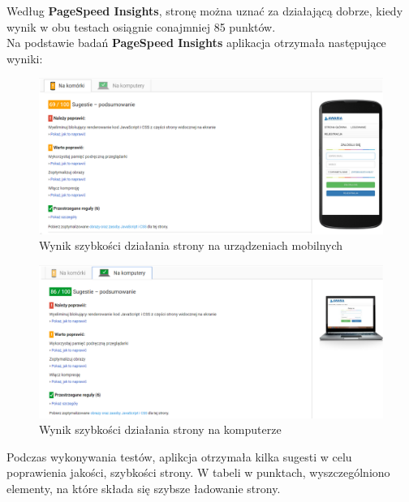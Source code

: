 \documentclass[openright]{xmgr}
\begin{document}
	Według \textbf{PageSpeed Insights}, stronę można uznać za działającą dobrze, kiedy wynik w obu testach osiągnie conajmniej 85 punktów.\\
	
	\newpage
	Na podstawie badań \textbf{PageSpeed Insights} aplikacja otrzymała następujące wyniki: 	
	
	\begin{figure}[!tbh]
		\centering
		\includegraphics[width=\linewidth]{image/phoneo}
		\caption{Wynik szybkości działania strony na urządzeniach mobilnych}
	\end{figure}
	
	\begin{figure}[!tbh]
		\centering
		\includegraphics[width=\linewidth]{image/computero}
		\caption{Wynik szybkości działania strony na komputerze}
	\end{figure}
	\newpage
	Podczas wykonywania testów, aplikcja otrzymała kilka sugesti w celu poprawienia jakości, szybkości strony. W tabeli w punktach, wyszczególniono elementy, na które składa się szybsze ładowanie strony.
	
\end{document}
